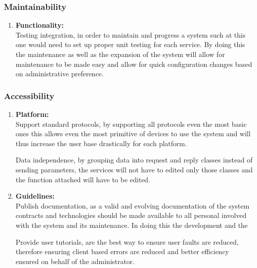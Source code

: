 \documentclass{article}
\begin{document}
		\subsubsection{Maintainability}

			\begin{enumerate}

				\item{\bfseries Functionality:}\\

				Testing integration, in order to maintain and progress a system such at this one would need to set up proper unit testing for each service. By doing this the maintenance as well as the expansion of the system will allow for maintenance to be made easy and allow for quick configuration changes based on administrative preference.

			\end{enumerate}

		\subsubsection{Accessibility}
		
			\begin{enumerate}

				\item{\bfseries Platform:}\\

				Support standard protocols, by supporting all protocols even the most basic ones this allows even the most primitive of devices to use the system and will thus increase the user base drastically for each platform.

				Data independence, by grouping data into request and reply classes instead of sending parameters, the services will not have to edited only those classes and the function attached will have to be edited.

				\item{\bfseries Guidelines:}\\

				Publish documentation, as a valid and evolving documentation of the system contracts and technologies should be made available to all personal involved with the system and its maintenance. In doing this the development and the 

				Provide user tutorials, are the best way to ensure user faults are reduced, therefore ensuring client based errors are reduced and better efficiency ensured on behalf of the administrator.
				
			\end{enumerate}
\end{document}

